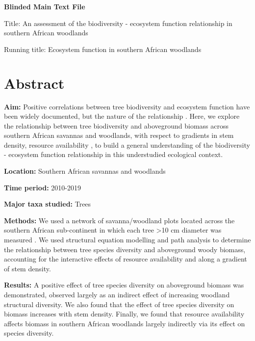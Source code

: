 \documentclass[11pt,a4paper]{article}
\begin{document}
\newpage{}

{\LARGE{\textbf{Blinded Main Text File}}}

\LARGE{Title: An assessment of the biodiversity - ecosystem function relationship in southern African woodlands}

\normalsize{Running title: Ecosystem function in southern African woodlands}

\section*{Abstract}

\textbf{Aim:} Positive correlations between tree biodiversity and ecosystem function have been widely documented, but the nature of the relationship . Here, we explore the relationship between tree biodiversity and aboveground biomass across southern African savannas and woodlands, with respect to gradients in stem density, resource availability , to build a general understanding of the biodiversity - ecosystem function relationship in this understudied ecological context.

\textbf{Location:} Southern African savannas and woodlands

\textbf{Time period:} 2010-2019

\textbf{Major taxa studied:} Trees

\textbf{Methods:} We used a network of \nplots{} savanna/woodland plots located across the southern African sub-continent in which each tree >10 cm diameter was measured . We used structural equation modelling and path analysis to determine the relationship between tree species diversity and aboveground woody biomass, accounting for the interactive effects of resource availability and along a gradient of stem density.

\textbf{Results:} A positive effect of tree species diversity on aboveground biomass was demonstrated, observed largely as an indirect effect of increasing woodland structural diversity. We also found that the effect of tree species diversity on biomass increases with stem density. Finally, we found that resource availability affects biomass in southern African woodlands largely indirectly via its effect on species diversity.
\end{document}
